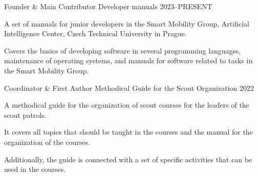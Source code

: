 

\begin{cventries}

  \cventry
    {Founder \& Main Contributor} %
    {} %
    {Developer manuals} %
    {2023--PRESENT} %
    {
      \begin{cvitems} %
        \item {A set of manuals for junior developers in the Smart Mobility Group, Artificial Intelligence Center, Czech Technical University in Prague.}
        \item Covers the basics of developing software in several programming languages, maintenance of operating systems, and manuals for software related to tasks in the Smart Mobility Group.
      \end{cvitems}
    }

\cventry
{Coordinator \& First Author} %
{} %
{Methodical Guide for the Scout Organization} %
{2022} %
{
  \begin{cvitems} %
    \item {A methodical guide for the organization of scout courses for the leaders of the scout patrols.}
    \item{It covers all topics that should be taught in the courses and the manual for the organization of the courses.}
    \item{Additionally, the guide is connected with a set of specific activities that can be used in the courses.}
  \end{cvitems}
}

\end{cventries}
